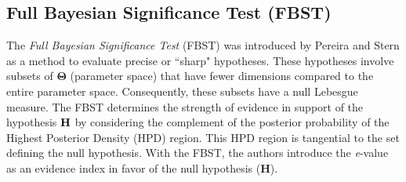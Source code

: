 \documentclass[AMA,Times1COL]{WileyNJDv5} %
\begin{document}







\subsection{Full Bayesian Significance Test  (FBST)}

The \emph{Full Bayesian Significance Test}  (FBST) was introduced by Pereira and Stern \cite{PerSter-99} as a method to evaluate precise or ``sharp"  hypotheses. These hypotheses involve subsets of $\boldsymbol{\Theta}$ (parameter space) that have fewer dimensions compared to the entire parameter space. Consequently, these subsets have a null Lebesgue measure. The FBST determines the strength of evidence in support of the hypothesis $\text{\textbf{H}}$ by considering the complement of the posterior probability of the Highest Posterior Density (HPD) region. This HPD region is tangential to the set defining the null hypothesis. With the FBST, the authors introduce the \textit{e}-value as an evidence index in favor of the null hypothesis (\textbf{H}). 


\end{document}
